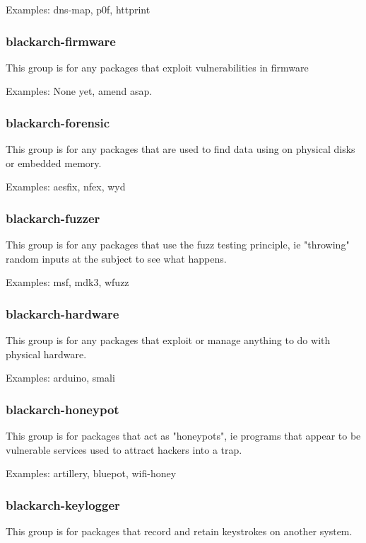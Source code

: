 \documentclass[a4paper, oneside, 11pt]{book}
\begin{document}
Examples: dns-map, p0f, httprint

\subsubsection{blackarch-firmware}

This group is for any packages that exploit vulnerabilities in firmware

Examples: None yet, amend asap.

\subsubsection{blackarch-forensic}

This group is for any packages that are used to find data using on physical disks or embedded memory.

Examples: aesfix, nfex, wyd 

\subsubsection{blackarch-fuzzer}

This group is for any packages that use the fuzz testing principle, ie "throwing" random inputs at the subject to see what happens.

Examples: msf, mdk3, wfuzz

\subsubsection{blackarch-hardware}

This group is for any packages that exploit or manage anything to do with physical hardware.

Examples: arduino, smali

\subsubsection{blackarch-honeypot}

This group is for packages that act as "honeypots", ie programs that appear to be vulnerable services used to attract hackers into a trap.

Examples: artillery, bluepot, wifi-honey

\subsubsection{blackarch-keylogger}

This group is for packages that record and retain keystrokes on another system.
\end{document}
